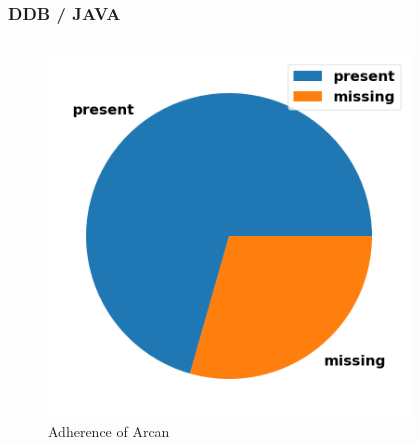 \documentclass[dvipsnames, 10pt, table]{beamer}
\begin{document}
\begin{frame}
  \frametitle{DDB / JAVA}
  \begin{columns}
    \begin{column}{0.3\textwidth}
      \begin{figure}
        \begin{center}
          \includegraphics[width=1.0\textwidth]{figures/testing/pie-plot-java-arcan.png}
          \caption{Adherence of Arcan}
        \end{center}
      \end{figure}
    \end{column}
    \begin{column}{0.3\textwidth}
      \begin{figure}
        \begin{center}

\end{center}
\end{figure}
\end{column}
\end{columns}
\end{frame}
\end{document}
